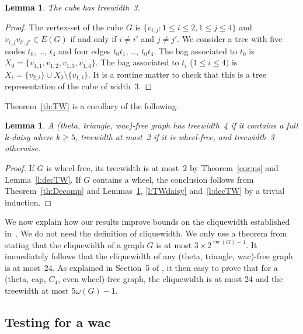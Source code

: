 \documentclass[11pt]{article}
\newtheorem{lemma}[theo]{Lemma}
\newcommand{\sm}{\setminus}
\DeclareMathOperator{\tw}{tw}
\begin{document}
\begin{lemma}
  \label{l:TWcube}
    The cube has treewidth~3.   
\end{lemma}

\begin{proof}
  The vertex-set of the cube $G$ is $\{v_{i, j} : 1\leq i \leq 2, 1\leq j\leq 4\}$ and $v_{i, j}v_{i', j'} \in E(G)$ if and only if $i\neq i'$ and $j\neq j'$. 
  We consider a tree with five nodes $t_0$, \dots, $t_4$ and four edges $t_0t_1$, \dots, $t_0t_4$.  
  The bag associated to $t_0$ is $X_0 = \{v_{1, 1}, v_{1, 2}, v_{1, 3}, v_{1, 4}\}$.  
  The bag associated to $t_i$ ($1\leq i \leq 4)$ is $X_i = \{v_{2, i}\} \cup X_0 \sm \{v_{1, i}\}$.  It is a routine matter to check that this is a tree representation of the cube of width~3.   
\end{proof}

Theorem~\ref{th:TW} is a corollary of the following. 

\begin{lemma}
  \label{l:tw}
  A (theta, triangle, wac)-free graph has treewidth~4 if it contains a full $k$-daisy where $k\geq 5$, treewidth at most~2 if it is wheel-free, and treewidth~3 otherwise. 
\end{lemma}

\begin{proof}
  If $G$ is wheel-free, its treewidth is at most~2 by Theorem~\ref{cor:us} and Lemma~\ref{l:decTW}.  If $G$ contains a wheel, the conclusion follows from Theorem~\ref{th:Decomp} and Lemmas~\ref{l:TWcube}, \ref{l:TWdaisy} and~\ref{l:decTW} by a trivial induction.
\end{proof}


We now explain how our results improve bounds on the cliquewidth established in~\cite{DBLP:journals/dm/CameronSHV18}.  
We do not need the definition of cliquewidth.  
We only use a theorem from~\cite{DBLP:journals/siamcomp/CorneilR05} stating that the cliquewidth of a graph $G$ is at most $3\times 2^{\tw(G) - 1}$.  It immediately follows that the cliquewidth of any (theta, triangle, wac)-free graph is at most~24. 
As explained in Section~5 of \cite{DBLP:journals/dm/CameronSHV18}, it then easy to prove that for a (theta, cap, $C_4$, even wheel)-free graph, 
 the cliquewidth  is at most 24 and the treewidth at most  $5  \omega(G) -1$. 

\subsection{Testing for a wac}
\label{s:testWac}
\end{document}
